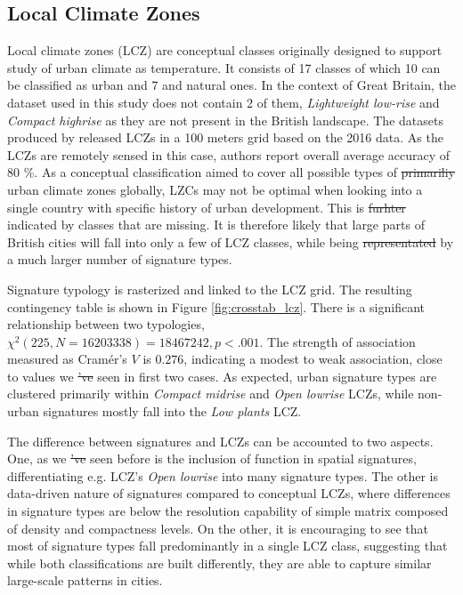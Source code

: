 \documentclass[fleqn,10pt]{wlscirep}
\providecommand{\DIFadd}[1]{{\protect\color{blue}\uwave{#1}}} %
\providecommand{\DIFdel}[1]{{\protect\color{red}\sout{#1}}}                      %
\providecommand{\DIFaddbegin}{} %
\providecommand{\DIFaddend}{} %
\providecommand{\DIFdelbegin}{} %
\providecommand{\DIFdelend}{} %
\begin{document}
\subsection*{Local Climate Zones}
Local climate zones (LCZ) are conceptual classes originally designed to support study of urban
climate as temperature. It consists of 17 classes of which 10 can be classified as urban
and 7 and natural ones. In the context of Great Britain, the dataset used in this study
does not contain 2 of them, \textit{Lightweight low-rise} and \textit{Compact highrise}
as they are not present in the British landscape. The datasets produced by
\cite{demuzere2019mapping} released LCZs in a 100 meters grid based on the 2016 data. As
the LCZs are remotely sensed in this case, authors report overall average accuracy of 80 \%.
As a conceptual classification aimed to cover all possible types of \DIFdelbegin \DIFdel{primariliy }\DIFdelend \DIFaddbegin \DIFadd{primarily }\DIFaddend urban climate zones globally,
LZCs may not be optimal when looking into a single country with specific history of urban
development. This is \DIFdelbegin \DIFdel{furhter }\DIFdelend \DIFaddbegin \DIFadd{further }\DIFaddend indicated by classes that are missing. It is therefore likely
that large parts of British cities will fall into only a few of LCZ classes, while being \DIFdelbegin \DIFdel{representated
}\DIFdelend \DIFaddbegin \DIFadd{represented
}\DIFaddend by a much larger number of signature types.

Signature typology is rasterized and linked to the LCZ grid.
The resulting contingency table is shown in Figure \ref{fig:crosstab_lcz}. There is a
significant relationship between two typologies, $\chi^{2} (225, N = 16203338) = 18467242,
p < .001$. The strength of association measured as Cramér's $V$ is $0.276$, indicating
a modest to weak association, close to values we \DIFdelbegin \DIFdel{'ve }\DIFdelend \DIFaddbegin \DIFadd{have }\DIFaddend seen in first two cases. As expected,
urban signature types are clustered primarily within \textit{Compact midrise} and
\textit{Open lowrise} LCZs, while non-urban signatures mostly fall into the \textit{Low plants} LCZ.

The difference between signatures and LCZs can be accounted to two aspects. One, as we \DIFdelbegin \DIFdel{'ve }\DIFdelend \DIFaddbegin \DIFadd{have }\DIFaddend seen
before is the inclusion of function in spatial signatures, differentiating e.g. LCZ's \textit{Open lowrise} into
many signature types. The other is data-driven nature of signatures compared to conceptual LCZs,
where differences in signature types are below the resolution capability of simple matrix composed of
density and compactness levels. On the other, it is encouraging to see that most of signature types
fall predominantly in a single LCZ class, suggesting that while both classifications are built differently,
they are able to capture similar large-scale patterns in cities.
\end{document}
